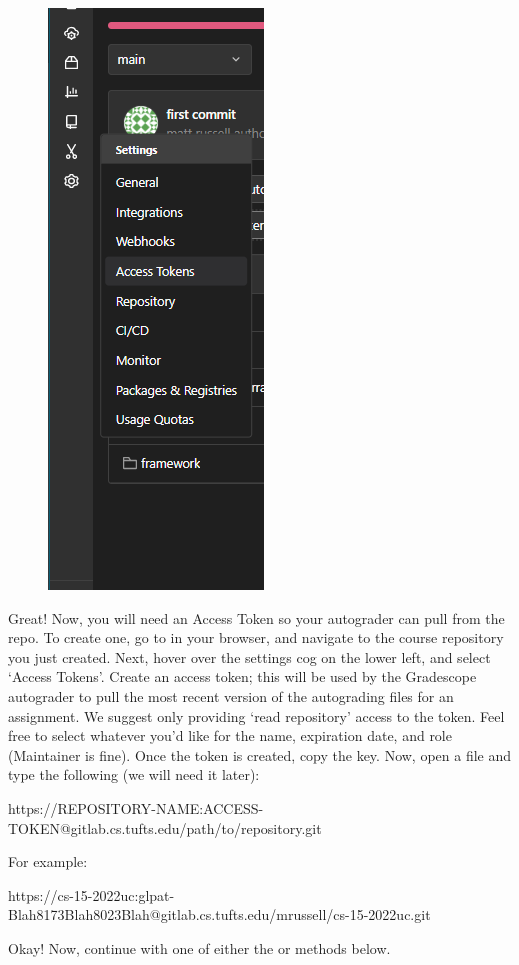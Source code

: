 \documentclass[11pt]{report}
\begin{document}
\begin{figure}
      \includegraphics[scale=0.7]{access_token.png}
\end{figure}
Great! Now, you will need an Access Token so your autograder can pull from the repo. To create one, 
go to  in your browser, and navigate to the course repository you just created.
Next, hover over the settings cog on the lower left, and select `Access Tokens'.
Create an access token; this will be used by the Gradescope autograder to pull the most recent version 
of the autograding files for an assignment. We suggest only providing `read repository' access to the token. Feel free 
to select whatever you'd like for the name, expiration date, and role (Maintainer is fine). Once the 
token is created, copy the key. Now, open a file and type the following (we will need it later):
\\
\begin{bashcodeblock}
https://REPOSITORY-NAME:ACCESS-TOKEN@gitlab.cs.tufts.edu/path/to/repository.git
\end{bashcodeblock}
For example:
\begin{bashcodeblock}
https://cs-15-2022uc:glpat-Blah8173Blah8023Blah@gitlab.cs.tufts.edu/mrussell/cs-15-2022uc.git
\end{bashcodeblock}
Okay! Now, continue with one of either the  or  methods below.
\end{document}
